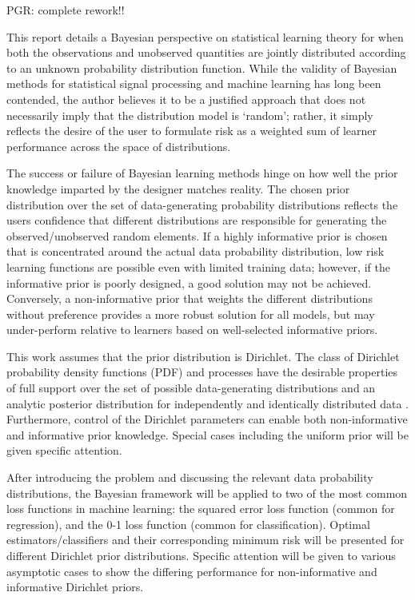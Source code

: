 \documentclass[12pt]{report}
\begin{document}
PGR: complete rework!!

This report details a Bayesian perspective on statistical learning theory for when both the observations and unobserved quantities are jointly distributed according to an unknown probability distribution function. While the validity of Bayesian methods for statistical signal processing and machine learning has long been contended, the author believes it to be a justified approach that does not necessarily imply that the distribution model is `random'; rather, it simply reflects the desire of the user to formulate risk as a weighted sum of learner performance across the space of distributions. 

The success or failure of Bayesian learning methods hinge on how well the prior knowledge imparted by the designer matches reality. The chosen prior distribution over the set of data-generating probability distributions reflects the users confidence that different distributions are responsible for generating the observed/unobserved random elements. If a highly informative prior \cite{box} is chosen that is concentrated around the actual data probability distribution, low risk learning functions are possible even with limited training data; however, if the informative prior is poorly designed, a good solution may not be achieved. Conversely, a non-informative prior that weights the different distributions without preference provides a more robust solution for all models, but may under-perform relative to learners based on well-selected informative priors.

This work assumes that the prior distribution is Dirichlet. The class of Dirichlet probability density functions (PDF) and processes have the desirable properties of full support over the set of possible data-generating distributions and an analytic posterior distribution for independently and identically distributed data \cite{ferguson}. Furthermore, control of the Dirichlet parameters can enable both non-informative and informative prior knowledge. Special cases including the uniform prior will be given specific attention.

After introducing the problem and discussing the relevant data probability distributions, the Bayesian framework will be applied to two of the most common loss functions in machine learning: the squared error loss function (common for regression), and the 0-1 loss function \cite{berger} (common for classification). Optimal estimators/classifiers and their corresponding minimum risk will be presented for different Dirichlet prior distributions. Specific attention will be given to various asymptotic cases to show the differing performance for non-informative and informative Dirichlet priors.
\end{document}
